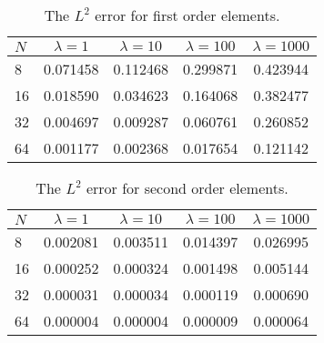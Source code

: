 \documentclass[twocolumn, article]{memoir}
\begin{document}
\begin{table}[tbp]
    \centering
    \caption{The \(L^2\) error for first order elements.}
    \label{tab:first_order_error}
    \begin{tabular}{lcccc}
    \toprule
    {\(N\)} &      \( \lambda = 1\)    &      \(\lambda = 10\)   &      \( \lambda = 100\)  &      \( \lambda = 1000\) \\
    \midrule
    8  &  0.071458 &  0.112468 &  0.299871 &  0.423944 \\
    16 &  0.018590 &  0.034623 &  0.164068 &  0.382477 \\
    32 &  0.004697 &  0.009287 &  0.060761 &  0.260852 \\
    64 &  0.001177 &  0.002368 &  0.017654 &  0.121142 \\
    \bottomrule
    \end{tabular}
\end{table}

\begin{table}[tpb]
    \centering
    \caption{The \(L^2\) error for second order elements.}
    \label{tab:second_order_error}
    \begin{tabular}{lcccc}
    \toprule
    {\(N\)} &      \( \lambda = 1\)    &      \(\lambda = 10\)   &      \( \lambda = 100\)  &      \( \lambda = 1000\) \\
    \midrule
    8  &  0.002081 &  0.003511 &  0.014397 &  0.026995 \\
    16 &  0.000252 &  0.000324 &  0.001498 &  0.005144 \\
    32 &  0.000031 &  0.000034 &  0.000119 &  0.000690 \\
    64 &  0.000004 &  0.000004 &  0.000009 &  0.000064 \\
    \bottomrule
    \end{tabular}
\end{table}
\end{document}
